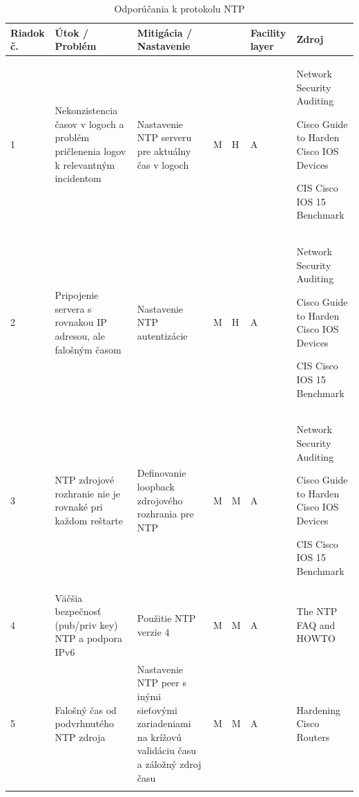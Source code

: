 \begin{longtable}[!htbp]{|C{2.5em}L{9em}L{9em}C{2em}C{2.5em}C{7.5em}L{10em}|}
	
	\hline
	\centering
	
	Riadok č.	&Útok / Problém	&Mitigácia / Nastavenie	& 	&	&Facility layer	&Zdroj\\
	\endhead

	 1	&Nekonzistencia časov v logoch a problém pričlenenia logov k relevantným incidentom	&Nastavenie NTP serveru pre aktuálny čas v logoch	&M	&H	&A	&Network Security Auditing \cite{Jackson2010}
	
	Cisco Guide to Harden Cisco IOS Devices \cite{Singh2018}
	
	CIS Cisco IOS 15 Benchmark \cite{CIS_DrTLsgXv24lxeIIM}\\
	2	&Pripojenie servera s rovnakou IP adresou, ale falošným časom	&Nastavenie NTP autentizácie	&M	&H	&A	&Network Security Auditing \cite{Jackson2010}
	
	Cisco Guide to Harden Cisco IOS Devices \cite{Singh2018}
	
	CIS Cisco IOS 15 Benchmark \cite{CIS_DrTLsgXv24lxeIIM}\\
	 3	&NTP zdrojové rozhranie nie je rovnaké pri každom reštarte	& Definovanie loopback zdrojového rozhrania pre NTP	&M	&M	&A	&Network Security Auditing \cite{Jackson2010}
	
	Cisco Guide to Harden Cisco IOS Devices \cite{Singh2018}
	
	CIS Cisco IOS 15 Benchmark \cite{CIS_DrTLsgXv24lxeIIM}\\
	4	&Väčšia bezpečnosť (pub/priv key) NTP a podpora IPv6	&Použitie NTP verzie 4	&M	&M	&A	&The NTP FAQ and HOWTO \cite{s0goWNnWp5OjqREE}\\
	 5	&Falošný čas od podvrhnutého NTP zdroja	&Nastavenie NTP peer s inými sieťovými zariadeniami na krížovú validáciu času a záložný zdroj času	&M	&M	&A	&Hardening Cisco Routers \cite{Akin2002}\\
	
	\hline
	\caption{Odporúčania k protokolu NTP}
	\label{tab:ntp}%
\end{longtable}%

